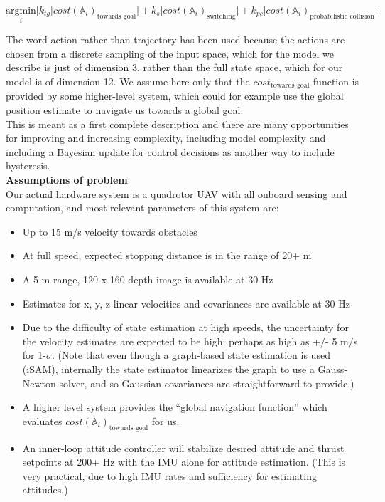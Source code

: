 \documentclass[paper=a4, fontsize=11pt]{scrartcl} %
\numberwithin{equation}{section} %
\numberwithin{figure}{section} %
\numberwithin{table}{section} %
\newcommand{\horrule}[1]{\rule{\linewidth}{#1}} %
\begin{document}
$$ \underset{i}{\text{argmin}} \bigg[ k_{tg}\big[ cost(\mathbb{A}_i)_{\text{towards goal}}  \big]+  k_{s} \big[ cost(\mathbb{A}_i)_{\text{switching}} \big]+   k_{pc}\big[ cost(\mathbb{A}_i)_{\text{probabilistic collision}} \big]  \bigg]$$

The word action rather than trajectory has been used because the actions are chosen from a discrete sampling of the input space, which for the model we describe is just of dimension 3, rather than the full state space, which for our model is of dimension 12.  We assume here only that the $cost_{\text{towards goal}}$ function is provided by some higher-level system, which could for example use the global position estimate to navigate us towards a global goal.\\




This is meant as a first complete description and there are many opportunities for improving and increasing complexity, including model complexity and including a Bayesian update for control decisions as another way to include hysteresis.\\  



\textbf{Assumptions of problem}
\\

Our actual hardware system is a quadrotor UAV with all onboard sensing and computation, and most relevant parameters of this system are: 
\begin{itemize}
\item Up to 15 m/s velocity towards obstacles
\item At full speed, expected stopping distance is in the range of 20+ m
\item A 5 m range, 120 x 160 depth image is available at 30 Hz
\item Estimates for x, y, z linear velocities and covariances are available at 30 Hz
\item Due to the difficulty of state estimation at high speeds, the uncertainty for the velocity estimates are expected to be high: perhaps as high as +/- 5 m/s for 1-$\sigma$.  (Note that even though a graph-based state estimation is used (iSAM), internally the state estimator linearizes the graph to use a Gauss-Newton solver, and so Gaussian covariances are straightforward to provide.)
\item A higher level system provides the ``global navigation function'' which evaluates $cost(\mathbb{A}_i)_{\text{towards goal}} $ for us.
\item An inner-loop attitude controller will stabilize desired attitude and thrust setpoints at 200+ Hz with the IMU alone for attitude estimation. (This is very practical, due to high IMU rates and sufficiency for estimating attitudes.)
\end{itemize}
\end{document}
